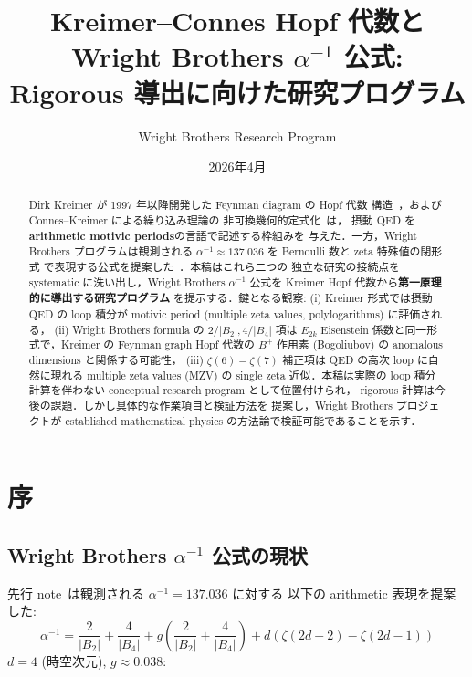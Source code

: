 \documentclass[11pt,a4paper]{article}
\title{Kreimer--Connes Hopf 代数と Wright Brothers $\alpha^{-1}$ 公式:\\
Rigorous 導出に向けた研究プログラム}
\author{Wright Brothers Research Program}
\date{2026年4月}
\begin{document}
\maketitle

\begin{abstract}
Dirk Kreimer が 1997 年以降開発した Feynman diagram の Hopf 代数
構造~\cite{Kreimer1997}，および Connes--Kreimer による繰り込み理論の
非可換幾何的定式化~\cite{ConnesKreimer1998, ConnesKreimer2000}は，
摂動 QED を\textbf{arithmetic motivic periods}の言語で記述する枠組みを
与えた．一方，Wright Brothers プログラムは観測される
$\alpha^{-1} \approx 137.036$ を Bernoulli 数と zeta 特殊値の閉形式
で表現する公式を提案した~\cite{wb-alpha}．本稿はこれら二つの
独立な研究の接続点を systematic に洗い出し，Wright Brothers $\alpha^{-1}$
公式を Kreimer Hopf 代数から\textbf{第一原理的に導出する研究プログラム}
を提示する．鍵となる観察: (i) Kreimer 形式では摂動 QED の loop 積分が
motivic period (multiple zeta values, polylogarithms) に評価される，
(ii) Wright Brothers formula の $2/|B_2|, 4/|B_4|$ 項は $E_{2k}$
Eisenstein 係数と同一形式で，Kreimer の Feynman graph Hopf 代数の
$B^+$ 作用素 (Bogoliubov) の anomalous dimensions と関係する可能性，
(iii) $\zeta(6) - \zeta(7)$ 補正項は QED の高次 loop に自然に現れる
multiple zeta values (MZV) の single zeta 近似．本稿は実際の loop 積分
計算を伴わない conceptual research program として位置付けられ，
rigorous 計算は今後の課題．しかし具体的な作業項目と検証方法を
提案し，Wright Brothers プロジェクトが established mathematical
physics の方法論で検証可能であることを示す．
\end{abstract}

\tableofcontents

\newpage
\section{序}

\subsection{Wright Brothers $\alpha^{-1}$ 公式の現状}

先行 note~\cite{wb-alpha}は観測される $\alpha^{-1} = 137.036$ に対する
以下の arithmetic 表現を提案した:
\begin{equation}\label{eq:wb-alpha}
\alpha^{-1} = \frac{2}{|B_2|} + \frac{4}{|B_4|} + g\left(\frac{2}{|B_2|} + \frac{4}{|B_4|}\right) + d(\zeta(2d-2) - \zeta(2d-1))
\end{equation}
$d = 4$ (時空次元), $g \approx 0.038$:
\end{document}
